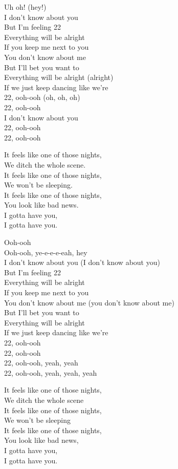 \begin{multicols}{2}
Uh oh! (hey!)\\
I don't know about you\\
But I'm feeling 22\\
Everything will be alright\\
If you keep me next to you\\
You don't know about me\\
But I'll bet you want to\\
Everything will be alright (alright)\\
If we just keep dancing like we're\\
22, ooh-ooh (oh, oh, oh)\\
22, ooh-ooh\\
I don't know about you\\
22, ooh-ooh\\
22, ooh-ooh

It feels like one of those nights,\\
We ditch the whole scene.\\
It feels like one of those nights,\\
We won't be sleeping.\\
It feels like one of those nights,\\
You look like bad news.\\
I gotta have you,\\
I gotta have you.

Ooh-ooh\\
Ooh-ooh, ye-e-e-e-eah, hey\\
I don't know about you (I don't know about you)\\
But I'm feeling 22\\
Everything will be alright\\
If you keep me next to you\\
You don't know about me (you don't know about me)\\
But I'll bet you want to\\
Everything will be alright\\
If we just keep dancing like we're\\
22, ooh-ooh\\
22, ooh-ooh\\
22, ooh-ooh, yeah, yeah\\
22, ooh-ooh, yeah, yeah, yeah

It feels like one of those nights,\\
We ditch the whole scene\\
It feels like one of those nights,\\
We won't be sleeping\\
It feels like one of those nights,\\
You look like bad news,\\
I gotta have you,\\
I gotta have you.
\end{multicols}